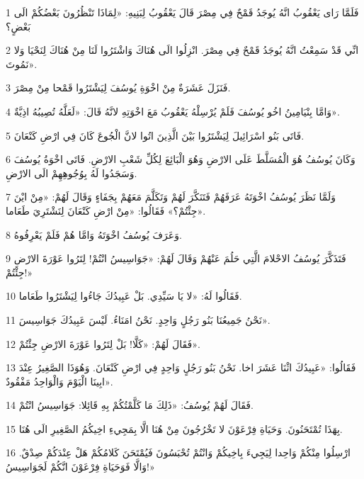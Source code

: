 \par 1 فَلَمَّا رَاى يَعْقُوبُ انَّهُ يُوجَدُ قَمْحٌ فِي مِصْرَ قَالَ يَعْقُوبُ لِبَنِيهِ: «لِمَاذَا تَنْظُرُونَ بَعْضُكُمْ الَى بَعْضٍ؟
\par 2 انِّي قَدْ سَمِعْتُ انَّهُ يُوجَدُ قَمْحٌ فِي مِصْرَ. انْزِلُوا الَى هُنَاكَ وَاشْتَرُوا لَنَا مِنْ هُنَاكَ لِنَحْيَا وَلا نَمُوتَ».
\par 3 فَنَزَلَ عَشَرَةٌ مِنْ اخْوَةِ يُوسُفَ لِيَشْتَرُوا قَمْحا مِنْ مِصْرَ.
\par 4 وَامَّا بِنْيَامِينُ اخُو يُوسُفَ فَلَمْ يُرْسِلْهُ يَعْقُوبُ مَعَ اخْوَتِهِ لانَّهُ قَالَ: «لَعَلَّهُ تُصِيبُهُ اذِيَّةٌ».
\par 5 فَاتَى بَنُو اسْرَائِيلَ لِيَشْتَرُوا بَيْنَ الَّذِينَ اتُوا لانَّ الْجُوعَ كَانَ فِي ارْضِ كَنْعَانَ.
\par 6 وَكَانَ يُوسُفُ هُوَ الْمُسَلَّطَ عَلَى الارْضِ وَهُوَ الْبَائِعَ لِكُلِّ شَعْبِ الارْضِ. فَاتَى اخْوَةُ يُوسُفَ وَسَجَدُوا لَهُ بِوُجُوهِهِمْ الَى الارْضِ.
\par 7 وَلَمَّا نَظَرَ يُوسُفُ اخْوَتَهُ عَرَفَهُمْ فَتَنَكَّرَ لَهُمْ وَتَكَلَّمَ مَعَهُمْ بِجَفَاءٍ وَقَالَ لَهُمْ: «مِنْ ايْنَ جِئْتُمْ؟» فَقَالُوا: «مِنْ ارْضِ كَنْعَانَ لِنَشْتَرِيَ طَعَاما».
\par 8 وَعَرَفَ يُوسُفُ اخْوَتَهُ وَامَّا هُمْ فَلَمْ يَعْرِفُوهُ.
\par 9 فَتَذَكَّرَ يُوسُفُ الاحْلامَ الَّتِي حَلُمَ عَنْهُمْ وَقَالَ لَهُمْ: «جَوَاسِيسُ انْتُمْ! لِتَرُوا عَوْرَةَ الارْضِ جِئْتُمْ!»
\par 10 فَقَالُوا لَهُ: «لا يَا سَيِّدِي. بَلْ عَبِيدُكَ جَاءُوا لِيَشْتَرُوا طَعَاما.
\par 11 نَحْنُ جَمِيعُنَا بَنُو رَجُلٍ وَاحِدٍ. نَحْنُ امَنَاءُ. لَيْسَ عَبِيدُكَ جَوَاسِيسَ».
\par 12 فَقَالَ لَهُمْ: «كَلَّا! بَلْ لِتَرُوا عَوْرَةَ الارْضِ جِئْتُمْ».
\par 13 فَقَالُوا: «عَبِيدُكَ اثْنَا عَشَرَ اخا. نَحْنُ بَنُو رَجُلٍ وَاحِدٍ فِي ارْضِ كَنْعَانَ. وَهُوَذَا الصَّغِيرُ عِنْدَ ابِينَا الْيَوْمَ وَالْوَاحِدُ مَفْقُودٌ».
\par 14 فَقَالَ لَهُمْ يُوسُفُ: «ذَلِكَ مَا كَلَّمْتُكُمْ بِهِ قَائِلا: جَوَاسِيسُ انْتُمْ.
\par 15 بِهَذَا تُمْتَحَنُونَ. وَحَيَاةِ فِرْعَوْنَ لا تَخْرُجُونَ مِنْ هُنَا الَّا بِمَجِيءِ اخِيكُمُ الصَّغِيرِ الَى هُنَا.
\par 16 ارْسِلُوا مِنْكُمْ وَاحِدا لِيَجِيءَ بِاخِيكُمْ وَانْتُمْ تُحْبَسُونَ فَيُمْتَحَنَ كَلامُكُمْ هَلْ عِنْدَكُمْ صِدْقٌ. وَالَّا فَوَحَيَاةِ فِرْعَوْنَ انَّكُمْ لَجَوَاسِيسُ!»
